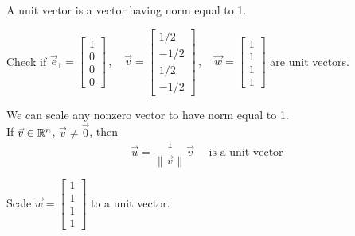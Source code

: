 \documentclass[pdf,9pt]{beamer}
\begin{document}
\begin{frame}
\begin{definition}
    A \alert{unit vector} is a vector having norm equal to 1.
\end{definition}
\vfill
\pause
\begin{example}
    Check if
    $
    \vec{e}_1 = \left[ \begin{array}{c} 1 \\ 0 \\ 0 \\ 0 \end{array} \right]\,, \quad
    \vec{v} = \left[ \begin{array}{r} 1/2 \\ -1/2 \\ 1/2 \\ -1/2 \end{array} \right]\,, \quad
    \vec{w} = \left[ \begin{array}{c} 1 \\ 1 \\ 1 \\ 1 \end{array} \right]
    $
    are unit vectors.
\end{example}
\end{frame}
\begin{frame}
    \begin{remark}
	We can scale any nonzero vector to have norm equal to 1. \\[3pt]
	If $\vec{v} \in \mathbb{R}^n$, $\vec{v} \neq \vec{0}$, then
	$$
	\vec{u} = \frac{1}{\|\vec{v}\|} \vec{v} \quad \mbox{ is a unit vector}
	$$
    \end{remark}

    \vspace{12pt}

    \begin{problem}
    Scale $\vec{w} = \left[ \begin{array}{c} 1 \\ 1 \\ 1 \\ 1 \end{array} \right]$ to a unit vector.
    \end{problem}
    \vspace{4cm}
\end{frame}
\end{document}
